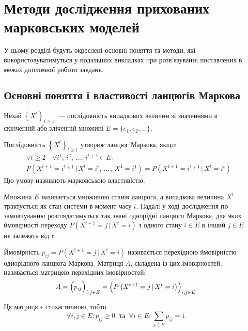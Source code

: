 
\chapter{Методи дослідження прихованих марковських моделей}
\label{chap: review}

У цьому розділі будуть окреслені основні поняття та методи, які використовуватимуться у подальших викладках при розв'язуванні поставлених в межах дипломної роботи завдань.

\section{Основні поняття і властивості ланцюгів Маркова}

Нехай $\left\{ X^t \right\}_{t\geqslant 1}$~--- послідовність випадкових величин зі значеннями в скінченній або зліченній множині $E=\{ e_1,e_2,\ldots \}$. 

\begin{definition}\label{def: markovian property}
    Послідовність $\left\{ X^t \right\}_{t\geqslant 1}$ утворює ланцюг Маркова, якщо:
    \begin{align*}
        & \forall t\geqslant 2 \quad \forall i^1,\,i^2,\,\ldots,\,i^{t+1} \in E: \\
	    & P\left( X^{t+1}=i^{t+1} \, |\, X^t=i^t,\,\ldots\,,\, X^1=i^1 \right)=P\left( X^{t+1}=i^{t+1} \, |\, X^t=i^t \right)
    \end{align*}
    Цю умову називають марковською властивістю.
\end{definition}

Множина $E$ називається множиною станів ланцюга, а випадкова величина $X^t$ трактується як стан системи в момент часу $t$. Надалі у ході дослідження по замовчуванню розглядатимуться так звані однорідні ланцюги Маркова, для яких ймовірності переходу $P\left( X^{t+1}=j\,|\,X^{t}=i \right)$ з одного стану $i \in E$ в інший $j \in E$ не залежать від $t$.

Ймовірність $p_{ij} = P\left( X^{t+1}=j\,|\,X^{t}=i \right)$ називається перехідною ймовірністю однорідного ланцюга Маркова. Матриця $A$, складена із цих імовірностей, називається матрицею перехідних імовірностей:
\begin{equation*}
    A = \Bigl( p_{ij} \Bigr)_{i,j \in E} = \Bigl( P\left( X^{t+1}=j\,|\,X^{t}=i \right) \Bigr)_{i,j \in E}
\end{equation*} 

Ця матриця є стохастичною, тобто
\begin{equation*}
    \forall i,j \in E: p_{ij} \geqslant 0\ \text{ та }\ \forall i \in E: \sum\limits_{j \in E} p_{ij} = 1
\end{equation*}

